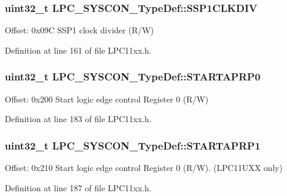 \subsubsection[{\texorpdfstring{S\+S\+P1\+C\+L\+K\+D\+IV}{SSP1CLKDIV}}]{ uint32\+\_\+t L\+P\+C\+\_\+\+S\+Y\+S\+C\+O\+N\+\_\+\+Type\+Def\+::\+S\+S\+P1\+C\+L\+K\+D\+IV}\hypertarget{group___l_p_c11xx___definitions_ga0b3aeb90b3e045b2bafa727bf55fa4e0}{}\label{group___l_p_c11xx___definitions_ga0b3aeb90b3e045b2bafa727bf55fa4e0}
Offset\+: 0x09C S\+S\+P1 clock divider (R/W) 

Definition at line 161 of file L\+P\+C11xx.\+h.

\subsubsection[{\texorpdfstring{S\+T\+A\+R\+T\+A\+P\+R\+P0}{STARTAPRP0}}]{ uint32\+\_\+t L\+P\+C\+\_\+\+S\+Y\+S\+C\+O\+N\+\_\+\+Type\+Def\+::\+S\+T\+A\+R\+T\+A\+P\+R\+P0}\hypertarget{group___l_p_c11xx___definitions_ga2c25ccf3a127a6304bbd0cbf6b7b79d9}{}\label{group___l_p_c11xx___definitions_ga2c25ccf3a127a6304bbd0cbf6b7b79d9}
Offset\+: 0x200 Start logic edge control Register 0 (R/W) 

Definition at line 183 of file L\+P\+C11xx.\+h.

\subsubsection[{\texorpdfstring{S\+T\+A\+R\+T\+A\+P\+R\+P1}{STARTAPRP1}}]{ uint32\+\_\+t L\+P\+C\+\_\+\+S\+Y\+S\+C\+O\+N\+\_\+\+Type\+Def\+::\+S\+T\+A\+R\+T\+A\+P\+R\+P1}\hypertarget{group___l_p_c11xx___definitions_ga5396148c86ac74f5144944ff3a3c6eb9}{}\label{group___l_p_c11xx___definitions_ga5396148c86ac74f5144944ff3a3c6eb9}
Offset\+: 0x210 Start logic edge control Register 0 (R/W). (L\+P\+C11\+U\+XX only) 

Definition at line 187 of file L\+P\+C11xx.\+h.

